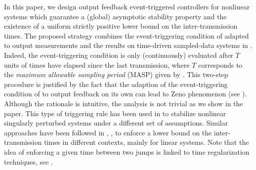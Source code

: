 \documentclass[a4paper, 9pt, twocolumn]{IEEEtran}
\theoremstyle{plain}
\theoremstyle{definition}
\begin{document}
In this paper, we design output feedback event-triggered controllers for nonlinear systems which guarantee a (global) asymptotic stability property and the existence of a uniform strictly positive lower bound on the inter-transmission times. The proposed strategy combines the event-triggering condition of \cite{Tabuada2007event} adapted to output measurements and the results on time-driven sampled-data systems in \cite{Nesic2009explicit}. Indeed, the event-triggering condition is only (continuously) evaluated after $T$ units of times have elapsed since the last transmission, where $T$ corresponds to the \textit{maximum allowable sampling period} (MASP) given by \cite{Nesic2009explicit}. This two-step procedure is justified by the fact that the adaption of the event-triggering condition of \cite{Tabuada2007event} to output feedback on its own can lead to Zeno phenomenon (see \cite{Donkers2012output}). Although the rationale is intuitive, the analysis is not trivial as we show in the paper. This type of triggering rule has been used in \cite{Abdelrahim2013Event} to stabilize nonlinear singularly perturbed systems under a different set of assumptions. Similar approaches have been followed in \cite{Forni2014event}, \cite{Mazo2011decentralized}, \cite{Wang2012asynchronous} to enforce a lower bound on the inter-transmission times in different contexts, mainly for linear systems. Note that the idea of enforcing a given time between two jumps is linked to time regularization techniques, see \cite{Johansson1999simulation}.
\end{document}
